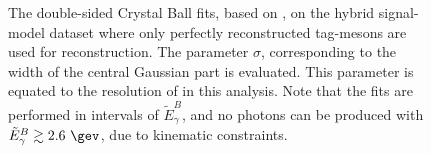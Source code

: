 \begin{figure}[htbp!]
{    }

    \caption{\label{fig:issignal_resolution_fits} The double-sided Crystal Ball fits, based on ,
    on the hybrid signal-model dataset where only perfectly reconstructed tag-\B mesons are used for \EB reconstruction.
    The parameter $\sigma$, corresponding to the width of the central Gaussian part is evaluated.
    This parameter is equated to the resolution of \EB in this analysis.
    Note that the fits are performed in intervals of $\tilde{E}_{\gamma}^B$, and no \BtoXsgamma photons can be produced with $\tilde{E}_{\gamma}^B\gtrsim 2.6~\gev$, due to kinematic constraints.
    }
\end{figure}

